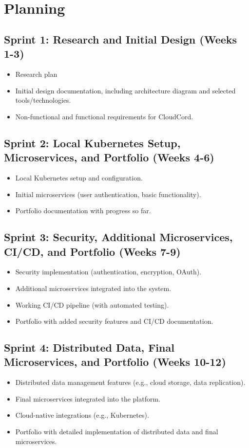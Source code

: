 \documentclass[12pt]{report}
\begin{document}
\chapter{Planning}

\section*{Sprint 1: Research and Initial Design (Weeks 1-3)}
\begin{itemize}
    \item Research plan
    \item Initial design documentation, including architecture diagram and selected tools/technologies.
    \item Non-functional and functional requirements for CloudCord.
\end{itemize}

\section*{Sprint 2: Local Kubernetes Setup, Microservices, and Portfolio (Weeks 4-6)}
\begin{itemize}
    \item Local Kubernetes setup and configuration.
    \item Initial microservices (user authentication, basic functionality).
    \item Portfolio documentation with progress so far.
\end{itemize}

\section*{Sprint 3: Security, Additional Microservices, CI/CD, and Portfolio (Weeks 7-9)}
\begin{itemize}
    \item Security implementation (authentication, encryption, OAuth).
    \item Additional microservices integrated into the system.
    \item Working CI/CD pipeline (with automated testing).
    \item Portfolio with added security features and CI/CD documentation.
\end{itemize}

\section*{Sprint 4: Distributed Data, Final Microservices, and Portfolio (Weeks 10-12)}
\begin{itemize}
    \item Distributed data management features (e.g., cloud storage, data replication).
    \item Final microservices integrated into the platform.
    \item Cloud-native integrations (e.g., Kubernetes).
    \item Portfolio with detailed implementation of distributed data and final microservices.
\end{itemize}
\end{document}
